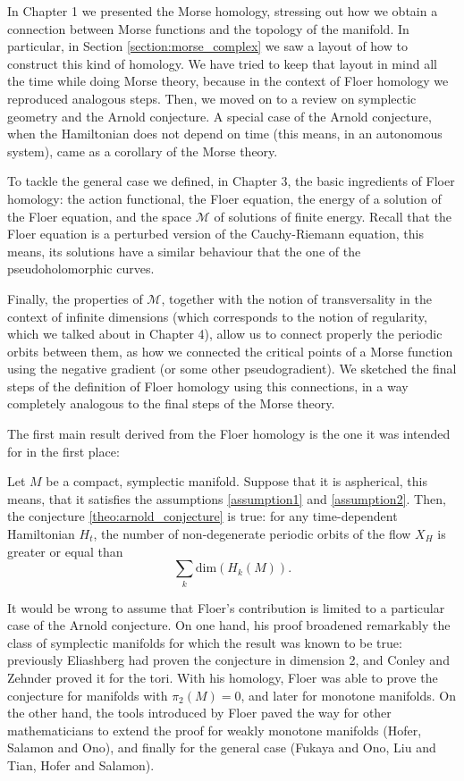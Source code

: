 In Chapter 1 we presented the Morse homology, stressing out how we obtain a connection between Morse functions and the topology of the manifold. In particular, in Section \ref{section:morse_complex} we saw a layout of how to construct this kind of homology. We have tried to keep that layout in mind all the time while doing Morse theory, because in the context of Floer homology we reproduced analogous steps. Then, we moved on to a review on symplectic geometry and the Arnold conjecture. A special case of the Arnold conjecture, when the Hamiltonian does not depend on time (this means, in an autonomous system), came as a corollary of the Morse theory.

To tackle the general case we defined, in Chapter 3, the basic ingredients of Floer homology: the action functional, the Floer equation, the energy of a solution of the Floer equation, and the space $\mathcal{M}$ of solutions of finite energy. Recall that the Floer equation is a perturbed version of the Cauchy-Riemann equation, this means, its solutions have a similar behaviour that the one of the pseudoholomorphic curves.

Finally, the properties of $\mathcal{M}$, together with the notion of transversality in the context of infinite dimensions (which corresponds to the notion of regularity, which we talked about in Chapter 4), allow us to connect properly the periodic orbits between them, as how we connected the critical points of a Morse function using the negative gradient (or some other pseudogradient). We sketched the final steps of the definition of Floer homology using this connections, in a way completely analogous to the final steps of the Morse theory.

The first main result derived from the Floer homology is the one it was intended for in the first place:

\begin{rmrk}
Let $M$ be a compact, symplectic manifold. Suppose that it is aspherical, this means, that it satisfies the assumptions \ref{assumption1} and \ref{assumption2}. Then, the conjecture \ref{theo:arnold_conjecture} is true: for any time-dependent Hamiltonian $H_t$, the number of non-degenerate periodic orbits of the flow $X_H$ is greater or equal than
\[\sum_k \mathrm{dim}(H_k(M)) .\]
\end{rmrk}

It would be wrong to assume that Floer's contribution is limited to a particular case of the Arnold conjecture. On one hand, his proof broadened remarkably the class of symplectic manifolds for which the result was known to be true: previously Eliashberg had proven the conjecture in dimension 2, and Conley and Zehnder proved it for the tori. With his homology, Floer was able to prove the conjecture for manifolds with $\pi_2(M) = 0$, and later for monotone manifolds. On the other hand, the tools introduced by Floer paved the way for other mathematicians to extend the proof for weakly monotone manifolds (Hofer, Salamon and Ono), and finally for the general case (Fukaya and Ono, Liu and Tian, Hofer and Salamon).

